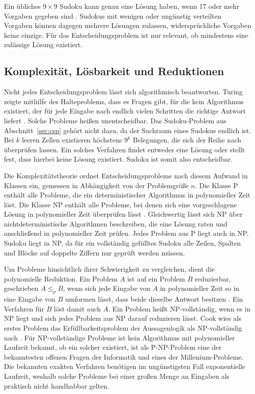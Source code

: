 Ein übliches $9 \times 9$ Sudoku kann genau eine Lösung haben, wenn 17 oder mehr Vorgaben gegeben sind . Sudokus mit wenigen oder ungünstig verteilten Vorgaben können dagegen mehrere Lösungen zulassen, widersprüchliche Vorgaben keine einzige. Für das Entscheidungsproblem ist nur relevant, ob mindestens eine zulässige Lösung existiert.

\subsection{Komplexität, Lösbarkeit und Reduktionen}\label{sec:komplexitaet}
Nicht jedes Entscheidungsproblem lässt sich algorithmisch beantworten. Turing zeigte mithilfe des Halteproblems, dass es Fragen gibt, für die kein Algorithmus existiert, der für jede Eingabe nach endlich vielen Schritten die richtige Antwort liefert . Solche Probleme heißen unentscheidbar. Das Sudoku-Problem aus Abschnitt~\ref{sec:csp} gehört nicht dazu, da der Suchraum eines Sudokus endlich ist. Bei $k$ leeren Zellen existieren höchstens $9^k$ Belegungen, die sich der Reihe nach überprüfen lassen. Ein solches Verfahren findet entweder eine Lösung oder stellt fest, dass hierbei keine Lösung existiert. Sudoku ist somit also entscheidbar.

Die Komplexitätstheorie ordnet Entscheidungsprobleme nach diesem Aufwand in Klassen ein, gemessen in Abhängigkeit von der Problemgröße $n$. Die Klasse P enthält alle Probleme, die ein deterministischer Algorithmus in polynomieller Zeit löst. Die Klasse NP enthält alle Probleme, bei denen sich eine vorgeschlagene Lösung in polynomieller Zeit überprüfen lässt . Gleichwertig lässt sich NP über nichtdeterministische Algorithmen beschreiben, die eine Lösung raten und anschließend in polynomieller Zeit prüfen. Jedes Problem aus P liegt auch in NP. Sudoku liegt in NP, da für ein vollständig gefülltes Sudoku alle Zeilen, Spalten und Blöcke auf doppelte Ziffern nur geprüft werden müssen.

Um Probleme hinsichtlich ihrer Schwierigkeit zu vergleichen, dient die polynomielle Reduktion. Ein Problem $A$ ist auf ein Problem $B$ reduzierbar, geschrieben $A \leq_p B$, wenn sich jede Eingabe von $A$ in polynomieller Zeit so in eine Eingabe von $B$ umformen lässt, dass beide dieselbe Antwort besitzen . Ein Verfahren für $B$ löst damit auch $A$. Ein Problem heißt NP-vollständig, wenn es in NP liegt und sich jedes Problem aus NP darauf reduzieren lässt. Cook wies als erstes Problem das Erfüllbarkeitsproblem der Aussagenlogik als NP-vollständig nach . Für NP-vollständige Probleme ist kein Algorithmus mit polynomieller Laufzeit bekannt, ob ein solcher existiert, ist als P-NP-Problem eine der bekanntesten offenen Fragen der Informatik und eines der Millenium-Probleme. Die bekannten exakten Verfahren benötigen im ungünstigsten Fall exponentielle Laufzeit, weshalb solche Probleme bei einer großen Menge an Eingaben als praktisch nicht handhabbar gelten.

